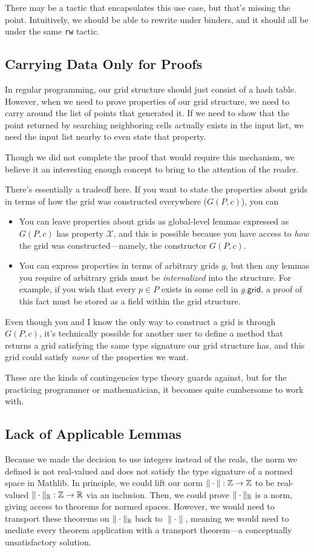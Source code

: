 \documentclass{article}
\begin{document}
There may be a tactic that encapsulates this use case, but that's missing the point.
Intuitively, we should be able to rewrite under binders, and it should all be under the same \texttt{rw} tactic.

\subsection{Carrying Data Only for Proofs}
In regular programming, our grid structure should just consist of a hash table.
However, when we need to prove properties of our grid structure, we need to carry around the list of points that generated it.
If we need to show that the point returned by searching neighboring cells actually exists in the input list, we need the input list nearby to even state that property.

Though we did not complete the proof that would require this mechanism, we believe it an interesting enough concept to bring to the attention of the reader.

There's essentially a tradeoff here.
If you want to state the properties about grids in terms of how the grid was constructed everywhere ($G(P, c)$), you can
\begin{itemize}
  \item You can leave properties about grids as global-level lemmas expressed as $G(P, c)$ has property $\mathcal{X}$, and this is possible because you have access to \textit{how} the grid was constructed---namely, the constructor $G(P, c)$.
  \item You can express properties in terms of arbitrary grids $g$, but then any lemmas you require of arbitrary grids must be \textit{internalized} into the structure.
  For example, if you wish that every $p \in P$ exists in some cell in $g.\mathsf{grid}$, a proof of this fact must be stored as a field within the grid structure.
\end{itemize}
Even though you and I know the only way to construct a grid is through $G(P, c)$, it's technically possible for another user to define a method that returns a grid satisfying the same type signature our grid structure has, and this grid could satisfy \textit{none} of the properties we want.

These are the kinds of contingencies type theory guards against, but for the practicing programmer or mathematician, it becomes quite cumbersome to work with.


\subsection{Lack of Applicable Lemmas}
Because we made the decision to use integers instead of the reals, the norm we defined is not real-valued and does not satisfy the type signature of a normed space in Mathlib.  
In principle, we could lift our norm $\| \cdot \| : \mathbb{Z} \to \mathbb{Z}$ to be real-valued $\| \cdot \|_{\mathbb{R}} : \mathbb{Z} \to \mathbb{R}$ via an inclusion.
Then, we could prove $\| \cdot \|_{\mathbb{R}}$ is a norm, giving access to theorems for normed spaces.
However, we would need to transport these theorems on $\| \cdot \|_{\mathbb{R}}$ back to $\| \cdot \|$, meaning we would need to mediate every theorem application with a transport theorem---a conceptually unsatisfactory solution.
\end{document}
